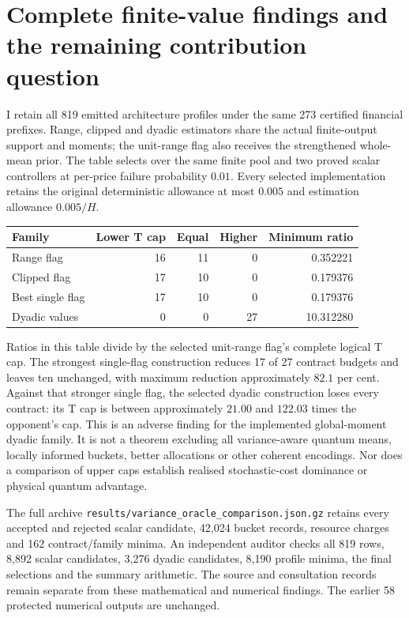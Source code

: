 \section{Complete finite-value findings and the remaining contribution question}
\label{sec:finite-value-findings}

I retain all 819 emitted architecture profiles under the same 273 certified
financial prefixes. Range, clipped and dyadic estimators share the actual
finite-output support and moments; the unit-range flag also receives the
strengthened whole-mean prior. The table selects over the same finite pool and
two proved scalar controllers at per-price failure probability $0.01$.
Every selected implementation retains the original deterministic allowance
at most $0.005$ and estimation allowance $0.005/H$.

\begin{center}
\begin{tabular}{lrrrr}
\toprule
Family & Lower T cap & Equal & Higher & Minimum ratio\\
\midrule
Range flag &16&11&0&0.352221\\
Clipped flag &17&10&0&0.179376\\
Best single flag &17&10&0&0.179376\\
Dyadic values &0&0&27&10.312280\\
\bottomrule
\end{tabular}
\end{center}

Ratios in this table divide by the selected unit-range flag's complete
logical T cap. The strongest single-flag construction reduces 17 of 27
contract budgets and leaves ten unchanged, with maximum reduction approximately
$82.1$ per cent. Against that stronger single flag, the selected dyadic
construction loses every contract: its T cap is between approximately
$21.00$ and $122.03$ times the opponent's cap. This is an adverse finding for
the implemented global-moment dyadic family. It is not a theorem excluding
all variance-aware quantum means, locally informed buckets, better allocations
or other coherent encodings. Nor does a comparison of upper caps establish
realised stochastic-cost dominance or physical quantum advantage.

The full archive \texttt{results/variance\_oracle\_comparison.json.gz}
retains every accepted and rejected scalar candidate, 42,024 bucket records,
resource charges and 162 contract/family minima. An independent auditor checks
all 819 rows, 8,892 scalar candidates, 3,276 dyadic candidates, 8,190 profile
minima, the final selections and the summary arithmetic. The source and
consultation records remain separate from these mathematical and numerical
findings. The earlier 58 protected numerical outputs are unchanged.

